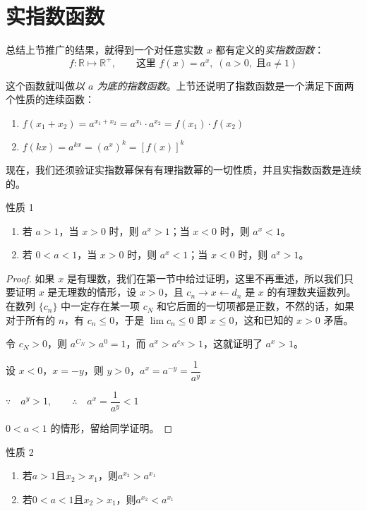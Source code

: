 \section{实指数函数}
总结上节推广的结果，就得到一个对任意实数 $x$ 都有定义的\emph{实指数函数}：
\[f:\mathbb{R}\mapsto \mathbb{R}^+,\qquad \text{这里}\,\, f(x)=a^x,\; (a>0, \; \text{且}a\ne 1)\]

这个函数就叫做\emph{以 $a$ 为底的指数函数}。上节还说明了指数函数是一个满足下面两个性质的连续函数：
\begin{enumerate}
  \item $f(x_1+x_2)=a^{x_1+x_2}=a^{x_1}\cdot a^{x_2}=f(x_1)\cdot f(x_2)$
  \item $f(kx)=a^{kx}=(a^x)^k=[f(x)]^k$
\end{enumerate}

现在，我们还须验证实指数幂保有有理指数幂的一切性质，并且实指数函数是连续的。

\begin{Theorem}{性质 1}
\begin{enumerate}
  \item 若 $a>1$，当 $x>0$ 时，则 $a^x>1$；当 $x<0$ 时，则 $a^x<1$。
  \item 若 $0<a<1$，当 $x>0$ 时，则 $a^x<1$；当 $x<0$ 时，则 $a^x>1$。
\end{enumerate}
\end{Theorem}

\begin{proof}
如果 $x$ 是有理数，我们在第一节中给过证明，这里不再重述，所以我们只要证明 $x$ 是无理数的情形，设 $x>0$，且 $c_n\to x\leftarrow d_n$ 是 $x$ 的有理数夹逼数列。在数列 $\{c_n\}$ 中一定存在某一项 $c_N$ 和它后面的一切项都是正数，不然的话，如果对于所有的 $n$，有 $c_n\leqslant0$，于是 $\lim c_n\leqslant0$ 即 $x\leqslant0$，这和已知的 $x>0$ 矛盾。

令 $c_N>0$，则 $a^{C_N}>a^0=1$，而 $a^x>a^{c_N}>1$，这就证明了 $a^x>1$。

设 $x<0$，$x=-y$，则 $y>0$，$a^x=a^{-y}=\dfrac{1}{a^y}$

$\because\quad a^y>1,\qquad \therefore\quad a^x=\dfrac{1}{a^y}<1$

\bigskip
$0<a<1$ 的情形，留给同学证明。
\end{proof}

\begin{Theorem}{性质 2}
\begin{enumerate}
  \item 若$a>1$且$x_2>x_1$，则$a^{x_2}>a^{x_1}$
  \item 若$0<a<1$且$x_2>x_1$，则$a^{x_2}<a^{x_1}$
\end{enumerate}
\end{Theorem}

